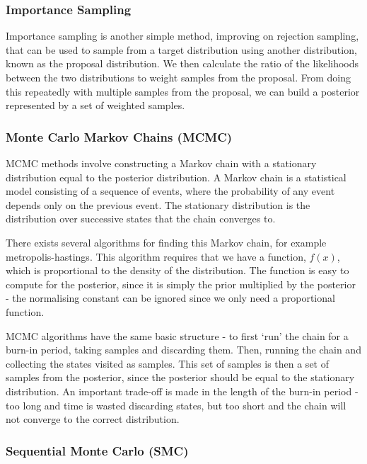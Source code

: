 \subsubsection{Importance Sampling}
		
Importance sampling is another simple method, improving on rejection sampling, that can be used to sample from a target distribution using another distribution, known as the proposal distribution. We then calculate the ratio of the likelihoods between the two distributions to weight samples from the proposal. From doing this repeatedly with multiple samples from the proposal, we can build a posterior represented by a set of weighted samples.
			
			
\subsubsection{Monte Carlo Markov Chains (MCMC)}
	
MCMC methods involve constructing a Markov chain with a stationary distribution equal to the posterior distribution. A Markov chain is a statistical model consisting of a sequence of events, where the probability of any event depends only on the previous event. The stationary distribution is the distribution over successive states that the chain converges to.
	
There exists several algorithms for finding this Markov chain, for example metropolis-hastings. This algorithm requires that we have a function, $f(x)$, which is proportional to the density of the distribution. The function is easy to compute for the posterior, since it is simply the prior multiplied by the posterior - the normalising constant can be ignored since we only need a proportional function.
	
MCMC algorithms have the same basic structure - to first `run' the chain for a burn-in period, taking samples and discarding them. Then, running the chain and collecting the states visited as samples. This set of samples is then a set of samples from the posterior, since the posterior should be equal to the stationary distribution. An important trade-off is made in the length of the burn-in period - too long and time is wasted discarding states, but too short and the chain will not converge to the correct distribution.

\subsubsection{Sequential Monte Carlo (SMC)}

